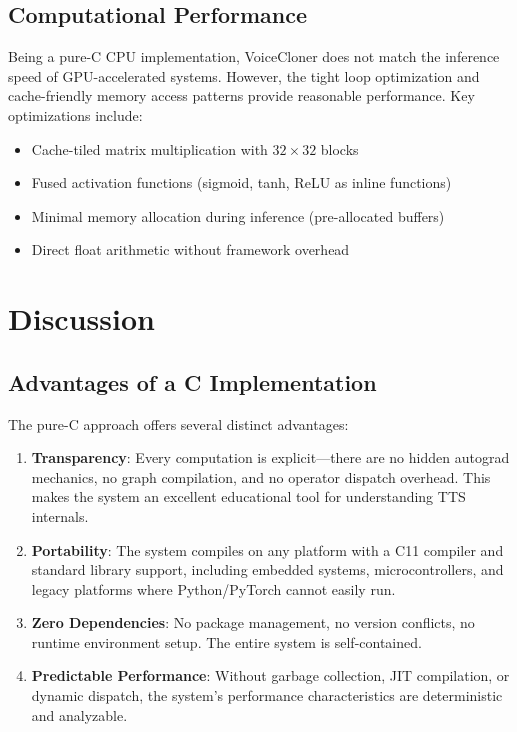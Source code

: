 \documentclass[conference]{IEEEtran}
\begin{document}
\subsection{Computational Performance}

Being a pure-C CPU implementation, VoiceCloner does not match the inference speed of GPU-accelerated systems. However, the tight loop optimization and cache-friendly memory access patterns provide reasonable performance. Key optimizations include:

\begin{itemize}
\item Cache-tiled matrix multiplication with $32 \times 32$ blocks
\item Fused activation functions (sigmoid, tanh, ReLU as inline functions)
\item Minimal memory allocation during inference (pre-allocated buffers)
\item Direct float arithmetic without framework overhead
\end{itemize}

\section{Discussion}

\subsection{Advantages of a C Implementation}

The pure-C approach offers several distinct advantages:

\begin{enumerate}
\item \textbf{Transparency}: Every computation is explicit—there are no hidden autograd mechanics, no graph compilation, and no operator dispatch overhead. This makes the system an excellent educational tool for understanding TTS internals.

\item \textbf{Portability}: The system compiles on any platform with a C11 compiler and standard library support, including embedded systems, microcontrollers, and legacy platforms where Python/PyTorch cannot easily run.

\item \textbf{Zero Dependencies}: No package management, no version conflicts, no runtime environment setup. The entire system is self-contained.

\item \textbf{Predictable Performance}: Without garbage collection, JIT compilation, or dynamic dispatch, the system's performance characteristics are deterministic and analyzable.
\end{enumerate}
\end{document}
